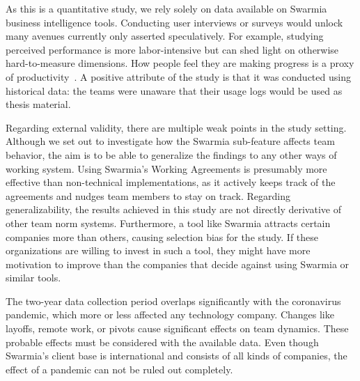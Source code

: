 As this is a quantitative study, we rely solely on data available on Swarmia business intelligence tools. Conducting user interviews or surveys would unlock many avenues currently only asserted speculatively. For example, studying perceived performance is more labor-intensive but can shed light on otherwise hard-to-measure dimensions. How people feel they are making progress is a proxy of productivity~\cite{forsgren_space_2021}. A positive attribute of the study is that it was conducted using historical data: the teams were unaware that their usage logs would be used as thesis material.

Regarding external validity, there are multiple weak points in the study setting. Although we set out to investigate how the Swarmia sub-feature affects team behavior, the aim is to be able to generalize the findings to any other ways of working system. Using Swarmia's Working Agreements is presumably more effective than non-technical implementations, as it actively keeps track of the agreements and nudges team members to stay on track. Regarding generalizability, the results achieved in this study are not directly derivative of other team norm systems. Furthermore, a tool like Swarmia attracts certain companies more than others, causing selection bias for the study. If these organizations are willing to invest in such a tool, they might have more motivation to improve than the companies that decide against using Swarmia or similar tools. 

The two-year data collection period overlaps significantly with the coronavirus pandemic, which more or less affected any technology company. Changes like layoffs, remote work, or pivots cause significant effects on team dynamics. These probable effects must be considered with the available data. Even though Swarmia's client base is international and consists of all kinds of companies, the effect of a pandemic can not be ruled out completely.